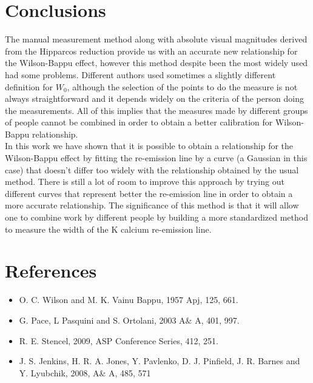 \documentclass[twocolumn]{AS4201}
\begin{document}
\section{Conclusions}
The manual measurement method along with absolute visual magnitudes derived from the Hipparcos reduction provide us with an accurate new relationship for the Wilson-Bappu effect, however this method despite been the most widely used had some problems. Different authors used sometimes a slightly different definition for $W_0$, although the selection of the points to do the measure is not always straightforward and it depends widely on the criteria of the person doing the measurements. All of this implies that the measures made by different groups of people cannot be combined in order to obtain a better calibration for Wilson-Bappu relationship.\\
In this work we have shown that it is possible to obtain a relationship for the Wilson-Bappu effect by fitting the re-emission line by a curve (a Gaussian in this case) that doesn't differ too widely with the relationship obtained by the usual method. There is still a lot of room to improve this approach by trying out different curves that represent better the re-emission line in order to obtain a more accurate relationship. The significance of this method is that it will allow one to combine work by different people by building a more standardized method to measure the width of the K calcium re-emission line.
\\
\section*{References}
\begin{itemize}
\item[] O. C. Wilson and M. K. Vainu Bappu, 1957 Apj, 125, 661.
\item[] G. Pace, L Pasquini and S. Ortolani, 2003 A\& A, 401, 997.
\item[] R. E.  Stencel, 2009, ASP Conference Series, 412, 251.
\item[] J. S. Jenkins, H. R. A. Jones, Y. Pavlenko, D. J. Pinfield, J. R. Barnes and Y. Lyubchik, 2008, A\& A, 485, 571
\end{itemize}
\end{document}
